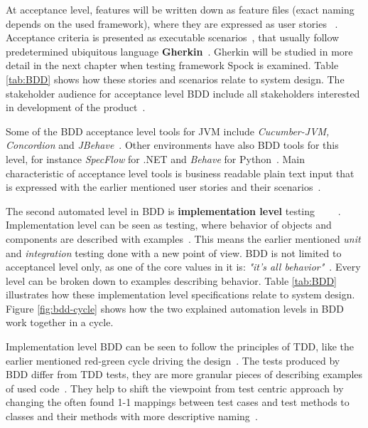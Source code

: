     At acceptance level, features will be written down as feature files (exact naming depends on the used framework), where they are
    expressed as user stories ~\cite{chelimsky2010rspec}. Acceptance criteria is presented as executable scenarios~\cite{bdd2006north}, that usually
    follow predetermined ubiquitous language \textbf{Gherkin}~\cite{okolnychyi2016study}. Gherkin will be studied in more detail in the next
    chapter when testing framework Spock is examined. Table \ref{tab:BDD} shows how these stories and scenarios relate to system design.
    The stakeholder audience for acceptance level BDD include all stakeholders interested in development of the product~\cite{smart2014bdd}.

    Some of the BDD acceptance level tools for JVM include \textit{Cucumber-JVM, Concordion} and \textit{JBehave}~\cite{okolnychyi2016study}. Other
    environments have also BDD tools for this level, for instance \textit{SpecFlow} for .NET and \textit{Behave} for Python~\cite{smart2014bdd}.
    Main characteristic of acceptance level tools is business readable plain text input that is expressed with the earlier mentioned
    user stories and their scenarios~\cite{okolnychyi2016study}.

    The second automated level in BDD is \textbf{implementation level} testing ~\cite{chelimsky2010rspec}~\cite{solis2011study}\newline~\cite{smart2014bdd}~\cite{okolnychyi2016study}.
    Implementation level can be seen as testing, where behavior of objects and components are described with examples~\cite{chelimsky2010rspec}.
    This means the earlier mentioned \textit{unit} and \textit{integration} testing done with a new point of view. BDD is not limited to acceptancel level
    only, as one of the core values in it is:
    \textit{"it's all behavior"}~\cite{chelimsky2010rspec}. Every level can be broken down to examples describing behavior.
    Table \ref{tab:BDD} illustrates how these implementation level specifications relate to system design. Figure \ref{fig:bdd-cycle}
    shows how the two explained automation levels in BDD work together in a cycle.

    Implementation level BDD can be seen to follow the principles of TDD, like the earlier mentioned red-green cycle driving
    the design~\cite{smart2014bdd}. The tests produced by BDD differ from TDD tests, they are more granular pieces of
    describing examples of used code~\cite{astels2006new}. They help to shift the viewpoint from test centric approach by
    changing the often found 1-1 mappings between test cases and test methods to classes and their methods with more descriptive naming~\cite{astels2006new}.

